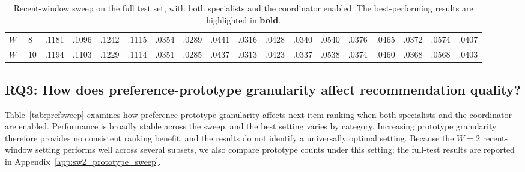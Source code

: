 ﻿\documentclass[sigconf,anonymous,review]{acmart}
\begin{document}
\begin{table}[!tbp]
{\begin{tabular}{l*{4}{rrrr}}
        $W=8$ & .1181 & .1096 & .1242 & .1115 & .0354 & .0289 & .0441 & .0316 & .0428 & .0340 & .0540 & .0376 & .0465 & .0372 & .0574 & .0407 \\
        $W=10$ & .1194 & .1103 & .1229 & .1114 & .0351 & .0285 & .0437 & .0313 & .0423 & .0337 & .0538 & .0374 & .0460 & .0368 & .0568 & .0403 \\
        \bottomrule
    \end{tabular}%
    }
    \caption{Recent-window sweep on the full test set, with both specialists and the coordinator enabled. The best-performing results are highlighted in \textbf{bold}.}
    \label{tab:short_window}
    \vspace{-0.3cm}
\end{table}



\subsection{RQ3: How does preference-prototype granularity affect recommendation quality?}

\label{sec:preference_experiments}

Table~\ref{tab:prefsweep} examines how preference-prototype granularity affects next-item ranking when both specialists and the coordinator are enabled. Performance is broadly stable across the sweep, and the best setting varies by category. Increasing prototype granularity therefore provides no consistent ranking benefit, and the results do not identify a universally optimal setting. Because the $W=2$ recent-window setting performs well across several subsets, we also compare prototype counts under this setting; the full-test results are reported in Appendix~\ref{app:sw2_prototype_sweep}.
\end{document}
